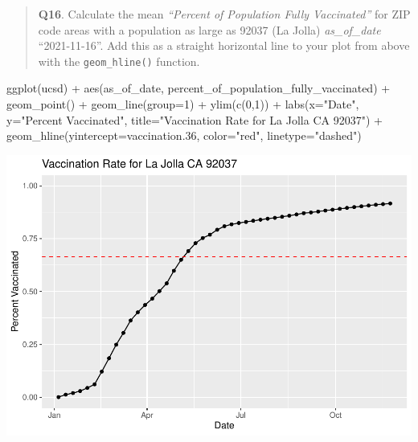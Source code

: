 \documentclass[
]{article}
\newenvironment{Shaded}{\begin{snugshade}}{\end{snugshade}}
\newcommand{\AttributeTok}[1]{\textcolor[rgb]{0.77,0.63,0.00}{#1}}
\newcommand{\DecValTok}[1]{\textcolor[rgb]{0.00,0.00,0.81}{#1}}
\newcommand{\FloatTok}[1]{\textcolor[rgb]{0.00,0.00,0.81}{#1}}
\newcommand{\FunctionTok}[1]{\textcolor[rgb]{0.00,0.00,0.00}{#1}}
\newcommand{\NormalTok}[1]{#1}
\newcommand{\OtherTok}[1]{\textcolor[rgb]{0.56,0.35,0.01}{#1}}
\newcommand{\SpecialCharTok}[1]{\textcolor[rgb]{0.00,0.00,0.00}{#1}}
\newcommand{\StringTok}[1]{\textcolor[rgb]{0.31,0.60,0.02}{#1}}
\begin{document}
\begin{quote}
\textbf{Q16}. Calculate the mean \emph{``Percent of Population Fully
Vaccinated''} for ZIP code areas with a population as large as 92037 (La
Jolla) \emph{as\_of\_date} ``2021-11-16''. Add this as a straight
horizontal line to your plot from above with the \texttt{geom\_hline()}
function.
\end{quote}

\begin{Shaded}
\end{Shaded}

\begin{Shaded}
\begin{Highlighting}[]
\FunctionTok{ggplot}\NormalTok{(ucsd) }\SpecialCharTok{+} \FunctionTok{aes}\NormalTok{(as\_of\_date, percent\_of\_population\_fully\_vaccinated) }\SpecialCharTok{+} 
  \FunctionTok{geom\_point}\NormalTok{() }\SpecialCharTok{+} \FunctionTok{geom\_line}\NormalTok{(}\AttributeTok{group=}\DecValTok{1}\NormalTok{) }\SpecialCharTok{+} \FunctionTok{ylim}\NormalTok{(}\FunctionTok{c}\NormalTok{(}\DecValTok{0}\NormalTok{,}\DecValTok{1}\NormalTok{)) }\SpecialCharTok{+} 
  \FunctionTok{labs}\NormalTok{(}\AttributeTok{x=}\StringTok{"Date"}\NormalTok{, }\AttributeTok{y=}\StringTok{"Percent Vaccinated"}\NormalTok{, }
       \AttributeTok{title=}\StringTok{"Vaccination Rate for La Jolla CA 92037"}\NormalTok{) }\SpecialCharTok{+} 
  \FunctionTok{geom\_hline}\NormalTok{(}\AttributeTok{yintercept=}\NormalTok{vaccination}\FloatTok{.36}\NormalTok{, }\AttributeTok{color=}\StringTok{"red"}\NormalTok{, }\AttributeTok{linetype=}\StringTok{"dashed"}\NormalTok{)}
\end{Highlighting}
\end{Shaded}

\includegraphics{Class17_files/figure-latex/unnamed-chunk-34-1.pdf}
\end{document}
